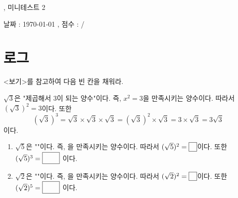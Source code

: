 \documentclass[a4paper]{oblivoir}
\begin{document}
\begin{center}
, 미니테스트 2
\end{center}
\begin{center}
날짜 : \today
,\qquad
점수 :  / 
\end{center}

\section{로그}

\begin{Exercise}
<보기>를 참고하여 다음 빈 칸을 채워라.
\begin{mdframed}[frametitle=<보기>]
\(\sqrt3\)은 "제곱해서 3이 되는 양수"이다.
즉, \(x^2=3\)을 만족시키는 양수이다.
따라서 \((\sqrt3)^2=3\)이다.
또한
\[(\sqrt3)^3=\sqrt3\times\sqrt3\times\sqrt3=(\sqrt3)^2\times\sqrt3=3\times\sqrt3=3\sqrt3\]
이다.
\end{mdframed}
\begin{enumerate}[(1)]
\item
\(\sqrt5\)은 ""이다.
즉, 을 만족시키는 양수이다.
따라서 \((\sqrt5)^2=\pb{5}\)이다.
또한
\((\sqrt5)^3=\pb{$5\sqrt5$}\)
이다.
\item
\(\sqrt2\)은 ""이다.
즉, 을 만족시키는 양수이다.
따라서 \((\sqrt2)^2=\pb{2}\)이다.
또한
\((\sqrt2)^5=\pb{$4\sqrt2$}\)
이다.
\end{enumerate}
\end{Exercise}

\shipoutAnswer
\end{document}

